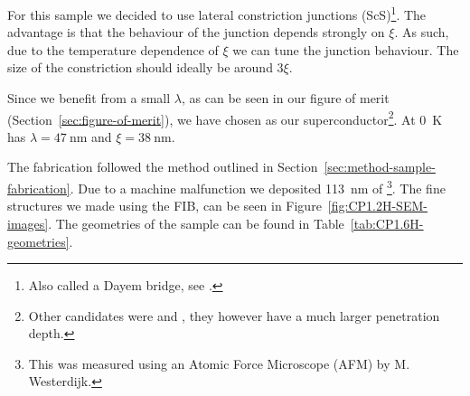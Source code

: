 For this sample we decided to use lateral constriction junctions (ScS)\footnote{Also called a Dayem bridge, see \citeauthor{likharevSuperconductingWeakLinks1979}\cite{likharevSuperconductingWeakLinks1979}.}. The advantage is that the behaviour of the junction depends strongly on $\xi$\cite{likharevSuperconductingWeakLinks1979}. As such, due to the temperature dependence of $\xi$ we can tune the junction behaviour. The size of the constriction should ideally be around $3\xi$\cite{likharevSuperconductingWeakLinks1979}.

Since we benefit from a small $\lambda$, as can be seen in our figure of merit (Section~\ref{sec:figure-of-merit}), we have chosen  as our superconductor\footnote{Other candidates were  and , they however have a much larger penetration depth.}. At \qty{0}{\kelvin}  has $\lambda = \qty{47}{\nano\meter}$ and $\xi = \qty{38}{\nano\meter}$\cite{maxfieldSuperconductingPenetrationDepth1965}.

The fabrication followed the method outlined in Section~\ref{sec:method-sample-fabrication}. Due to a machine malfunction we deposited \qty{113}{\nano\meter} of \footnote{This was measured using an Atomic Force Microscope (AFM) by M. Westerdijk.}. The fine structures we made using the FIB, can be seen in Figure~\ref{fig:CP1.2H-SEM-images}. The geometries of the sample can be found in Table~\ref{tab:CP1.6H-geometries}.

